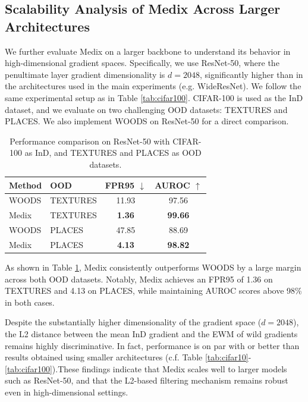 \documentclass[10pt]{article} %
\theoremstyle{plain}
\theoremstyle{definition}
\begin{document}
\subsection{Scalability Analysis of Medix Across Larger Architectures} 
\label{appendix:large_architectures}
We further evaluate Medix on a larger backbone to understand its behavior in high-dimensional gradient spaces. Specifically, we use ResNet-50, where the penultimate layer gradient dimensionality is \(d = 2048\), significantly higher than in the architectures used in the main experiments (e.g. WideResNet).
We follow the same experimental setup as in Table \ref{tab:cifar100}. CIFAR-100 is used as the InD dataset, and we evaluate on two challenging OOD datasets: TEXTURES and PLACES. We also implement WOODS \citep{pmlr-v162-katz-samuels22a} on ResNet-50 for a direct comparison.
\begin{table}
\vspace{-10pt}
\centering
\caption{Performance comparison on ResNet-50 with CIFAR-100 as InD, and TEXTURES and PLACES as OOD datasets.}
\footnotesize
\begin{tabular}{l l c c}
\toprule
\textbf{Method} & \textbf{OOD} & \textbf{FPR95} $\downarrow$ & \textbf{AUROC} $\uparrow$ \\
\midrule
WOODS & TEXTURES & 11.93 & 97.56 \\
Medix & TEXTURES & \textbf{1.36} & \textbf{99.66} \\
WOODS & PLACES & 47.85 & 88.69 \\
Medix & PLACES & \textbf{4.13} & \textbf{98.82} \\
\bottomrule
\end{tabular}
\vspace{-10pt}
\label{tab:resnet50_performance}
\end{table}
As shown in Table \ref{tab:resnet50_performance}, Medix consistently outperforms WOODS by a large margin across both OOD datasets. Notably, Medix achieves an FPR95 of 1.36 on TEXTURES and 4.13 on PLACES, while maintaining AUROC scores above 98\% in both cases.

Despite the substantially higher dimensionality of the gradient space (\(d=2048\)), the L2 distance between the mean InD gradient and the EWM of wild gradients remains highly discriminative. In fact, performance is on par with or better than results obtained using smaller architectures (c.f. Table \ref{tab:cifar10}-\ref{tab:cifar100}).These findings indicate that Medix scales well to larger models such as ResNet-50, and that the L2-based filtering mechanism remains robust even in high-dimensional settings.
\end{document}
